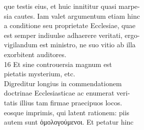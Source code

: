 \documentclass{article}
\begin{document}
\begin{pages}
                que testis eius, et huic innititur quasi marpe- \\
                sia cautes. Iam valet argumentum etiam hinc \\
                a conditione seu proprietate Ecclesiae, quae \\
                est semper indiuulse adhaerere veritati, ergo- \\
                vigilandum est ministro, ne suo vitio ab illa \\
                exorbitent auditores. \\
                16 Et sine controuersia magnum est \\
                pietatis mysterium, etc. \\
                Digreditur longius in commendationem \\
                doctrinae Ecclesiasticae ac enumerat veri- \\
                tatis illius tam firmae praecipuos locos. \\
                eosque imprimis, qui latent rationem: piis \\
                autem sunt ὁμολογούμενοι. Et petatur hinc \\
                

\end{pages}
\end{document}
